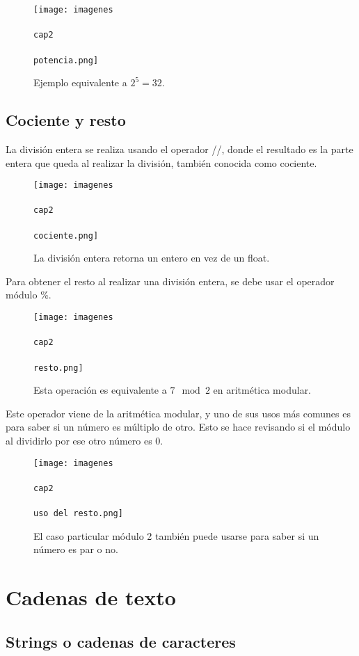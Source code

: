\documentclass{article}
\begin{document}
\begin{figure}[ht!]
  \texttt{[image: imagenes\\\\cap2\\\\potencia.png]}
  \caption{Ejemplo equivalente a $2 ^ 5 = 32$.}
\end{figure}

\subsection{Cociente y resto}

La división entera se realiza usando el operador //, donde el resultado es la parte entera que queda al realizar la división, también conocida como cociente.
  
\begin{figure}[ht!]
  \texttt{[image: imagenes\\\\cap2\\\\cociente.png]}
  \caption{La división entera retorna un entero en vez de un float.}
\end{figure}

Para obtener el resto al realizar una división entera, se debe usar el operador módulo \%.

\begin{figure}[ht!]
  \texttt{[image: imagenes\\\\cap2\\\\resto.png]}
  \caption{Esta operación es equivalente a $7 \mod{2}$ en aritmética modular.}
\end{figure}

Este operador viene de la aritmética modular, y uno de sus usos más comunes es para saber si un número es múltiplo de otro. Esto se hace revisando si el módulo al dividirlo por ese otro número es 0.

\begin{figure}[ht!]
  \texttt{[image: imagenes\\\\cap2\\\\uso del resto.png]}
  \caption{El caso particular módulo 2 también puede usarse para saber si un número es par o no.}
\end{figure}

\section{Cadenas de texto}

\subsection{Strings o cadenas de caracteres}
\end{document}
